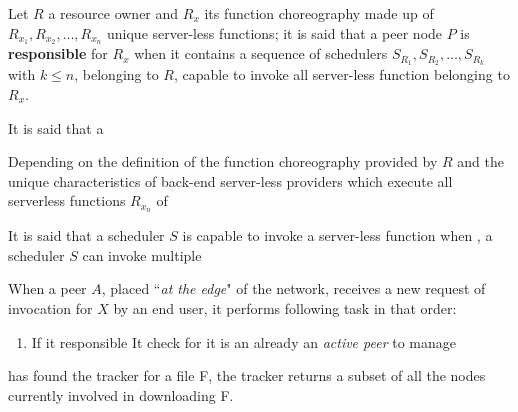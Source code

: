 \documentclass[10pt,a4paper]{article}
\begin{document}
Let $R$ a resource owner and $R_x$ its function choreography made up of $R_{x_1}, R_{x_2}, \ldots, R_{x_n}$ unique server-less functions; it is said that a peer node $P$ is \textbf{responsible} for $R_x$ when it contains a sequence of schedulers $S_{R_1}, S_{R_2}, \ldots, S_{R_k}$ with $k \leq n$, belonging to $R$, capable to invoke all server-less function belonging to $R_x$. 

It is said that a 

Depending on the definition of the function choreography provided by $R$ and the unique characteristics of back-end server-less providers which execute all serverless functions $R_{x_n}$ of 




It is said that a scheduler $S$ is capable to invoke a server-less function when 
, a scheduler $S$ can invoke multiple




When a peer $A$, placed ``\textit{at the edge}" of the network, receives a new request of invocation for $X$ by an end user, it performs following task in that order:

\begin{enumerate}
\item If it responsible It check for it is an already an \textit{active peer} to manage 
\end{enumerate}




 has found the tracker for a file F, the tracker returns a subset
of all the nodes currently involved in downloading F.
\end{document}
